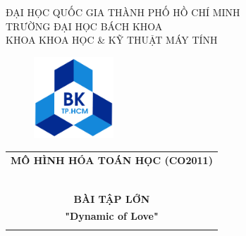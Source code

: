 \documentclass[a4paper]{article}
\begin{document}
\begin{titlepage}
\begin{center}
ĐẠI HỌC QUỐC GIA THÀNH PHỐ HỒ CHÍ MINH \\
TRƯỜNG ĐẠI HỌC BÁCH KHOA \\
KHOA KHOA HỌC \& KỸ THUẬT MÁY TÍNH 
\end{center}

\vspace{1cm}


\begin{figure}[h!]
\begin{center}
\includegraphics[width=3cm]{Images/hcmut.png}
\end{center}
\end{figure}

\vspace{1cm}


\begin{center}
\begin{tabular}{c}
\multicolumn{1}{l}{\textbf{{\Large MÔ HÌNH HÓA TOÁN HỌC (CO2011)}}}\\
~~\\
\hline
\\

\textbf{\huge BÀI TẬP LỚN}\\
\textbf{\huge "Dynamic of Love"}\\
\\
\hline
\end{tabular}
\end{center}

\vspace{1.5cm}


\end{titlepage}
\end{document}
